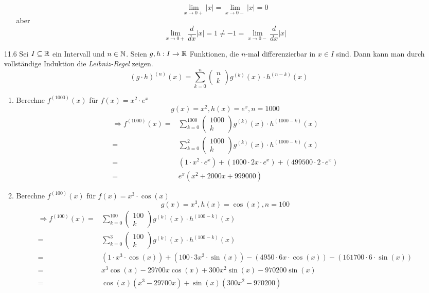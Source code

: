 \documentclass{HM}
\begin{document}
\begin{enumerate}
\begin{enumerate}
	$$\lim\limits_{x\to 0+}|x|=\lim\limits_{x\to 0-}|x|=0$$
	aber $$\lim\limits_{x\to 0+}\frac{d}{dx}|x|=1\not=-1=\lim\limits_{x\to 0-}\frac{d}{dx}|x|$$
\end{enumerate}
\newpage
\item [11.6] Sei $I\subseteq\mathbb{R}$ ein Intervall und $n\in\mathbb{N}$. Seien $g,h:I\to\mathbb{R}$ Funktionen, die $n$-mal differenzierbar in $x\in I$ sind. Dann kann man durch vollständige Induktion die \textit{Leibniz-Regel} zeigen.
$$(g\cdot h)^{(n)}(x)=\sum\limits_{k=0}^n\begin{pmatrix}
n\\k
\end{pmatrix}g^{(k)}(x)\cdot h^{(n-k)}(x)$$
\begin{enumerate}
	\item Berechne $f^{(1000)}(x)$ für $f(x)=x^2\cdot e^x$\\
	$$g(x)=x^2, h(x)=e^x, n=1000$$
	\begin{align*}
	\Rightarrow f^{(1000)}(x)=&\sum\limits_{k=0}^{1000}\begin{pmatrix}
1000\\k
\end{pmatrix} g^{(k)}(x)\cdot h^{(1000-k)}(x)\\
=&\sum\limits_{k=0}^{2}\begin{pmatrix}
1000\\k
\end{pmatrix}g^{(k)}(x)\cdot h^{(1000-k)}(x)\\
=&(1\cdot x^2\cdot e^x)+(1000\cdot 2x\cdot e^x)+
(499500\cdot 2\cdot e^x)\\
=&e^x(x^2+2000x+999000)
	\end{align*}
	\item Berechne $f^{(100)}(x)$ für $f(x)=x^3\cdot \cos(x)$\\
	$$g(x)=x^3, h(x)=\cos(x), n=100$$
	\begin{align*}
	\Rightarrow f^{(100)}(x)=&\sum\limits_{k=0}^{100}\begin{pmatrix}
100\\k
\end{pmatrix} g^{(k)}(x)\cdot h^{(100-k)}(x)\\
=&\sum\limits_{k=0}^{3}\begin{pmatrix}
100\\k
\end{pmatrix}g^{(k)}(x)\cdot h^{(100-k)}(x)\\
=&(1\cdot x^3\cdot \cos(x))+(100\cdot 3x^2\cdot \sin(x))-(4950\cdot 6x\cdot \cos(x))-(161700\cdot 6\cdot \sin(x))\\
=&x^3\cos(x)-29700x\cos(x)+300x^2\sin(x)-970200\sin(x)\\
=&\cos(x)(x^3-29700x)+\sin(x)(300x^2-970200)
	\end{align*}
\end{enumerate}
\end{enumerate}
\end{document}
